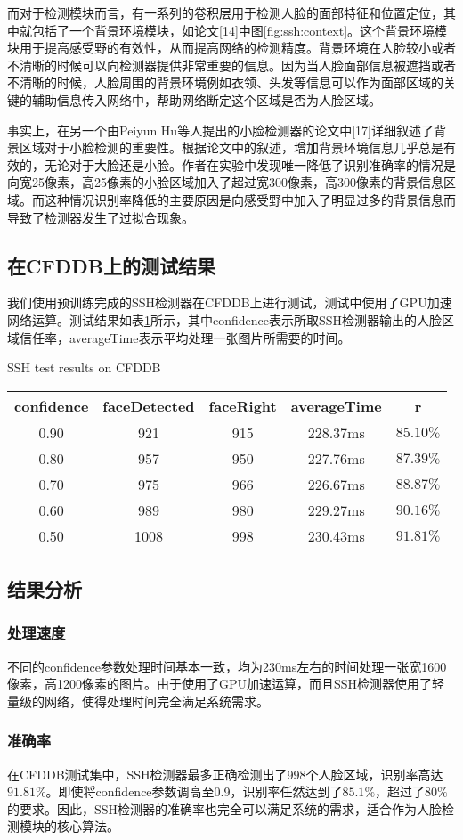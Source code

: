 而对于检测模块而言，有一系列的卷积层用于检测人脸的面部特征和位置定位，其中就包括了一个背景环境模块，如论文[14]中图\ref{fig:ssh:context}。这个背景环境模块用于提高感受野的有效性，从而提高网络的检测精度。背景环境在人脸较小或者不清晰的时候可以向检测器提供非常重要的信息。因为当人脸面部信息被遮挡或者不清晰的时候，人脸周围的背景环境例如衣领、头发等信息可以作为面部区域的关键的辅助信息传入网络中，帮助网络断定这个区域是否为人脸区域。

事实上，在另一个由Peiyun Hu等人提出的小脸检测器的论文中[17]详细叙述了背景区域对于小脸检测的重要性。根据论文中的叙述，增加背景环境信息几乎总是有效的，无论对于大脸还是小脸。作者在实验中发现唯一降低了识别准确率的情况是向宽25像素，高25像素的小脸区域加入了超过宽300像素，高300像素的背景信息区域。而这种情况识别率降低的主要原因是向感受野中加入了明显过多的背景信息而导致了检测器发生了过拟合现象。


\subsection{在CFDDB上的测试结果}

我们使用预训练完成的SSH检测器在CFDDB上进行测试，测试中使用了GPU加速网络运算。测试结果如表\ref{tab:ssh}所示，其中confidence表示所取SSH检测器输出的人脸区域信任率，averageTime表示平均处理一张图片所需要的时间。

\begin{table}[!hpb]
	\centering
	{SSH test results on CFDDB}
	\label{tab:ssh}
	\begin{tabular}{ cccc | c }
		\hline
		confidence & faceDetected & faceRight & averageTime & r\\
		\hline
		0.90 & 921 & 915 & 228.37ms & $85.10\%$\\
		0.80 & 957 & 950 & 227.76ms & $87.39\%$\\
		0.70 & 975 & 966 & 226.67ms & $88.87\%$\\
		0.60 & 989 & 980 & 229.27ms & $90.16\%$\\
		0.50 & 1008 & 998 & 230.43ms & $91.81\%$\\
		\hline
	\end{tabular}
\end{table}

\subsection{结果分析}

\subsubsection{处理速度}

不同的confidence参数处理时间基本一致，均为230ms左右的时间处理一张宽1600像素，高1200像素的图片。由于使用了GPU加速运算，而且SSH检测器使用了轻量级的网络，使得处理时间完全满足系统需求。

\subsubsection{准确率}

在CFDDB测试集中，SSH检测器最多正确检测出了998个人脸区域，识别率高达$91.81\%$。即使将confidence参数调高至0.9，识别率任然达到了$85.1\%$，超过了$80\%$的要求。因此，SSH检测器的准确率也完全可以满足系统的需求，适合作为人脸检测模块的核心算法。


